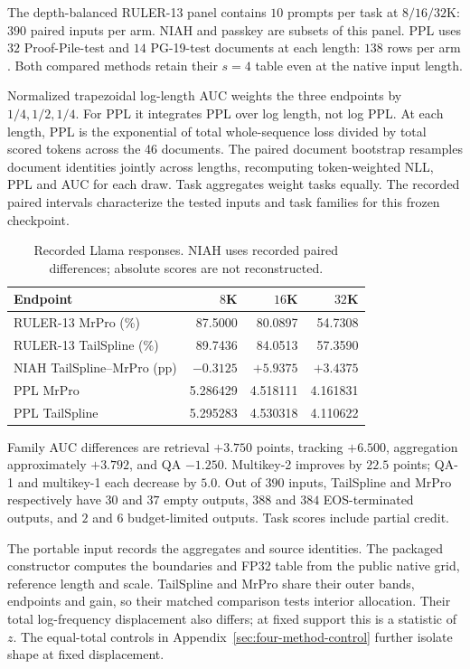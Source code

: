 The depth-balanced RULER-13 panel contains $10$ prompts per task at $8/16/32$K: $390$ paired inputs per arm. NIAH and passkey are subsets of this panel. PPL uses $32$ Proof-Pile-test and $14$ PG-19-test documents at each length: $138$ rows per arm \citep{azerbayev2022proofpile,rae2019compressive}. Both compared methods retain their $s=4$ table even at the native input length.

Normalized trapezoidal log-length AUC weights the three endpoints by $1/4,1/2,1/4$. For PPL it integrates PPL over log length, not log PPL. At each length, PPL is the exponential of total whole-sequence loss divided by total scored tokens across the 46 documents. The paired document bootstrap resamples document identities jointly across lengths, recomputing token-weighted NLL, PPL and AUC for each draw. Task aggregates weight tasks equally. The recorded paired intervals characterize the tested inputs and task families for this frozen checkpoint.
\begin{table}[ht]
\centering\small
\caption{Recorded Llama responses. NIAH uses recorded paired differences; absolute scores are not reconstructed.}
\begin{tabular}{@{}lrrr@{}}
\toprule
Endpoint & $8$K & $16$K & $32$K \\
\midrule
RULER-13 MrPro (\%) & 87.5000 & 80.0897 & 54.7308 \\
RULER-13 TailSpline (\%) & 89.7436 & 84.0513 & 57.3590 \\
NIAH TailSpline--MrPro (pp) & $-0.3125$ & $+5.9375$ & $+3.4375$ \\
PPL MrPro & 5.286429 & 4.518111 & 4.161831 \\
PPL TailSpline & 5.295283 & 4.530318 & 4.110622 \\
\bottomrule
\end{tabular}
\end{table}
\FloatBarrier
Family AUC differences are retrieval $+3.750$ points, tracking $+6.500$, aggregation approximately $+3.792$, and QA $-1.250$. Multikey-2 improves by $22.5$ points; QA-1 and multikey-1 each decrease by $5.0$. Out of $390$ inputs, TailSpline and MrPro respectively have $30$ and $37$ empty outputs, $388$ and $384$ EOS-terminated outputs, and $2$ and $6$ budget-limited outputs. Task scores include partial credit.

The portable input  records the aggregates and source identities. The packaged constructor computes the boundaries and FP32 table from the public native grid, reference length and scale. TailSpline and MrPro share their outer bands, endpoints and gain, so their matched comparison tests interior allocation. Their total log-frequency displacement also differs; at fixed support this is a statistic of $z$. The equal-total controls in Appendix~\ref{sec:four-method-control} further isolate shape at fixed displacement.
\FloatBarrier

